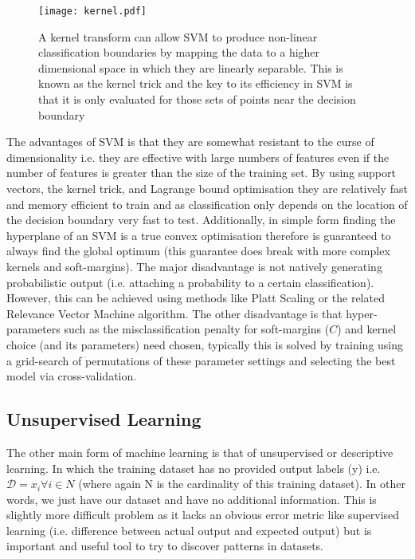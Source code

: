 \begin{figure}[h]
    \texttt{[image: kernel.pdf]}
    \caption{A kernel transform can allow SVM to produce non-linear classification boundaries by mapping
        the data to a higher dimensional space in which they are linearly separable. This is known as the kernel
        trick and the key to its efficiency in SVM is that it is only evaluated for those sets of points near the 
    decision boundary}
    \label{fig:kernel}
\end{figure}



The advantages of SVM is that they are somewhat resistant to the curse of dimensionality i.e. they are effective with large numbers of features
even if the number of features is greater than the size of the training set.  By using support vectors, the kernel trick, and Lagrange bound optimisation 
they are relatively fast and memory efficient to train and as classification only depends on the location of the decision boundary very fast to test.
Additionally, in simple form finding the hyperplane of an SVM is a true convex optimisation therefore is guaranteed to always find the global optimum (this
guarantee does break with more complex kernels and soft-margins).  
The major disadvantage is not natively generating probabilistic output (i.e. attaching a probability to a certain classification).  However, this can be achieved
using methods like Platt Scaling or the related Relevance Vector Machine algorithm.   The other disadvantage is that hyper-parameters such as the misclassification
penalty for soft-margins (\(C\)) and kernel choice (and its parameters) need chosen, typically this is solved by training using a grid-search of permutations
of these parameter settings and selecting the best model via cross-validation.


\subsection{Unsupervised Learning}

The other main form of machine learning is that of unsupervised or descriptive learning.
In which the training dataset has no provided output labels (y) i.e. 
\(\mathcal{D} = {x_{i} \forall i \in N}\) (where again N is the cardinality of 
this training dataset). In other words, we just have our dataset and have no additional information.
This is slightly more difficult problem as it lacks an obvious error metric like supervised learning 
(i.e. difference between actual output and expected output) but is important and useful tool to
try to discover patterns in datasets.

